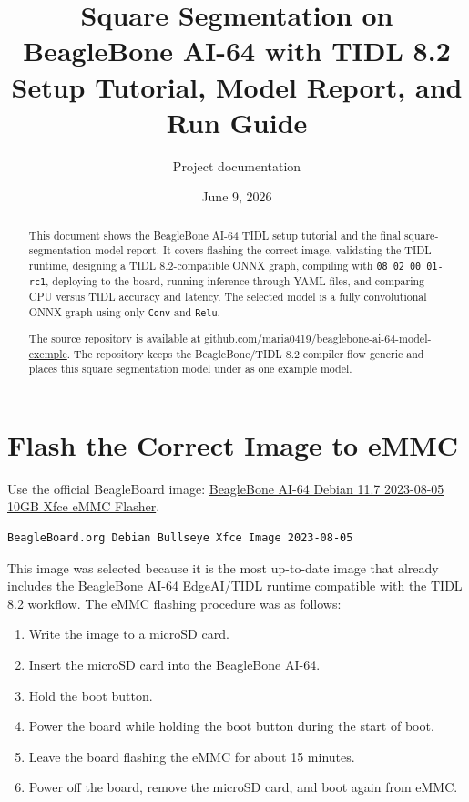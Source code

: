 \documentclass[11pt,a4paper]{article}
\title{Square Segmentation on BeagleBone AI-64 with TIDL 8.2\\Setup Tutorial, Model Report, and Run Guide}
\author{Project documentation}
\date{June 9, 2026}
\begin{document}
\maketitle

\begin{abstract}
This document shows the BeagleBone AI-64 TIDL setup tutorial and the final square-segmentation model report.  It covers flashing the correct image, validating the TIDL runtime, designing a TIDL 8.2-compatible ONNX graph, compiling with \texttt{08\_02\_00\_01-rc1}, deploying to the board, running inference through YAML files, and comparing CPU versus TIDL accuracy and latency.  The selected model is a fully convolutional ONNX graph using only \texttt{Conv} and \texttt{Relu}.

The source repository is available at \href{https://github.com/maria0419/beaglebone-ai-64-model-exemple}{github.com/maria0419/beaglebone-ai-64-model-exemple}.  The repository keeps the BeagleBone/TIDL 8.2 compiler flow generic and places this square segmentation model under  as one example model.
\end{abstract}

\section{Flash the Correct Image to eMMC}

Use the official BeagleBoard image: \href{https://www.beagleboard.org/distros/beaglebone-ai-64-xfce-2023-08-05-emmc-flasher}{BeagleBone AI-64 Debian 11.7 2023-08-05 10GB Xfce eMMC Flasher}.

\begin{lstlisting}
BeagleBoard.org Debian Bullseye Xfce Image 2023-08-05
\end{lstlisting}

This image was selected because it is the most up-to-date image that already includes the BeagleBone AI-64 EdgeAI/TIDL runtime compatible with the TIDL 8.2 workflow. The eMMC flashing procedure was as follows:

\begin{enumerate}
\item Write the image to a microSD card.
\item Insert the microSD card into the BeagleBone AI-64.
\item Hold the boot button.
\item Power the board while holding the boot button during the start of boot.
\item Leave the board flashing the eMMC for about 15 minutes.
\item Power off the board, remove the microSD card, and boot again from eMMC.
\end{enumerate}
\end{document}
